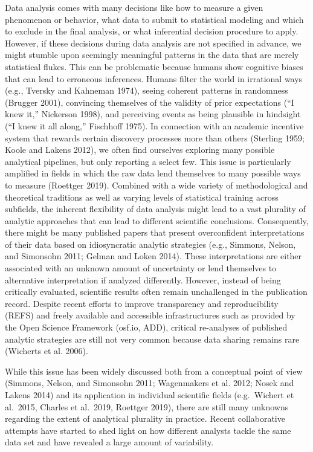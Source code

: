 \documentclass[
  12pt,
]{article}
\begin{document}
Data analysis comes with many decisions like how to measure a given phenomenon or behavior, what data to submit to statistical modeling and which to exclude in the final analysis, or what inferential decision procedure to apply.
However, if these decisions during data analysis are not specified in advance, we might stumble upon seemingly meaningful patterns in the data that are merely statistical flukes.
This can be problematic because humans show cognitive biases that can lead to erroneous inferences.
Humans filter the world in irrational ways (e.g., Tversky and Kahneman 1974), seeing coherent patterns in randomness (Brugger 2001), convincing themselves of the validity of prior expectations ({``I knew it,''} Nickerson 1998), and perceiving events as being plausible in hindsight ({``I knew it all along,''} Fischhoff 1975).
In connection with an academic incentive system that rewards certain discovery processes more than others (Sterling 1959; Koole and Lakens 2012), we often find ourselves exploring many possible analytical pipelines, but only reporting a select few.
This issue is particularly amplified in fields in which the raw data lend themselves to many possible ways to measure (Roettger 2019).
Combined with a wide variety of methodological and theoretical traditions as well as varying levels of statistical training across subfields, the inherent flexibility of data analysis might lead to a vast plurality of analytic approaches that can lead to different scientific conclusions.
Consequently, there might be many published papers that present overconfident interpretations of their data based on idiosyncratic analytic strategies (e.g., Simmons, Nelson, and Simonsohn 2011; Gelman and Loken 2014).
These interpretations are either associated with an unknown amount of uncertainty or lend themselves to alternative interpretation if analyzed differently.
However, instead of being critically evaluated, scientific results often remain unchallenged in the publication record.
Despite recent efforts to improve transparency and reproducibility (REFS) and freely available and accessible infrastructures such as provided by the Open Science Framework (osf.io, ADD), critical re-analyses of published analytic strategies are still not very common because data sharing remains rare (Wicherts et al. 2006).

While this issue has been widely discussed both from a conceptual point of view (Simmons, Nelson, and Simonsohn 2011; Wagenmakers et al. 2012; Nosek and Lakens 2014) and its application in individual scientific fields (e.g.~Wichert et al.~2015, Charles et al.~2019, Roettger 2019), there are still many unknowns regarding the extent of analytical plurality in practice.
Recent collaborative attempts have started to shed light on how different analysts tackle the same data set and have revealed a large amount of variability.
\end{document}
